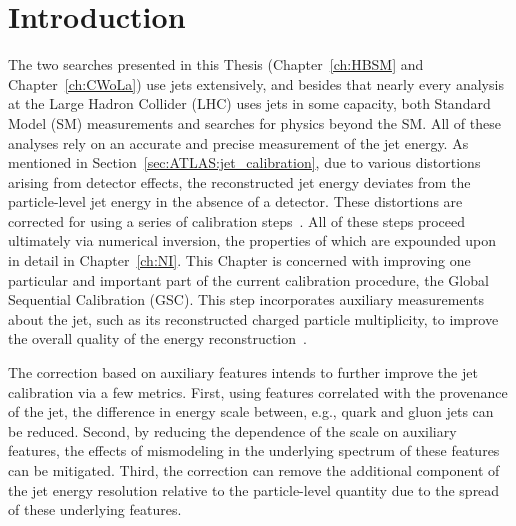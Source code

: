 \section{Introduction}
\label{sec:GenNI:intro}
The two searches presented in this Thesis (Chapter~\ref{ch:HBSM} and Chapter~\ref{ch:CWoLa}) use jets extensively, and besides that nearly every analysis at the Large Hadron Collider (LHC) uses jets in some capacity, both Standard Model (SM) measurements and searches for physics beyond the SM.
All of these analyses rely on an accurate and precise measurement of the jet energy.
As mentioned in Section~\ref{sec:ATLAS:jet_calibration}, due to various distortions arising from detector effects, the reconstructed jet energy deviates from the particle-level jet energy in the absence of a detector.
These distortions are corrected for using a series of calibration steps~\cite{PERF-2016-04,Aad:2011he}.
All of these steps proceed ultimately via numerical inversion, the properties of which are expounded upon in detail in Chapter~\ref{ch:NI}.
This Chapter is concerned with improving one particular and important part of the current calibration procedure, the Global Sequential Calibration (GSC).
This step incorporates auxiliary measurements about the jet, such as its reconstructed charged particle multiplicity, to improve the overall quality of the energy reconstruction~\cite{ATLAS-CONF-2015-002}.

The correction based on auxiliary features intends to further improve the jet calibration via a few metrics.
First, using features correlated with the provenance of the jet, the difference in energy scale between, e.g., quark and gluon jets can be reduced.
Second, by reducing the dependence of the scale on auxiliary features, the effects of mismodeling in the underlying spectrum of these features can be mitigated.
Third, the correction can remove the additional component of the jet energy resolution relative to the particle-level quantity due to the spread of these underlying features.

